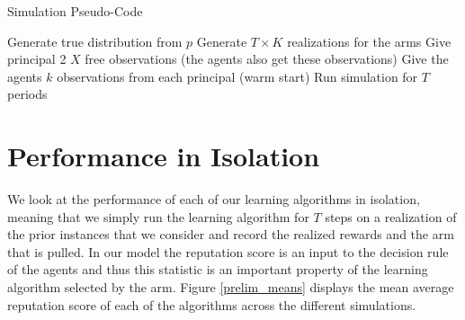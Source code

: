 \documentclass{article}
\theoremstyle{definition}
\begin{document}
\begin{algorithm}
\caption{Simulation Pseudo-Code}
\begin{algorithmic}[1]
\State Generate true distribution from $p$
\State Generate $T \times K$ realizations for the arms 
				\State Give principal 2 $X$ free observations (the agents also get these observations)				
				\State Give the agents $k$ observations from each principal (warm start)
				\State Run simulation for $T$ periods
			\EndFor
		\EndFor
	\EndFor
\EndFor
\end{algorithmic}
\label{alg_1}
\end{algorithm}

\section{Performance in Isolation}
\label{S:5}

We look at the performance of each of our learning algorithms in isolation, meaning that we simply run the learning algorithm for $T$ steps on a realization of the prior instances that we consider and record the realized rewards and the arm that is pulled. In our model the reputation score is an input to the decision rule of the agents and thus this statistic is an important property of the learning algorithm selected by the arm. Figure \ref{prelim_means} displays the mean average reputation score of each of the algorithms across the different simulations.
\end{document}

